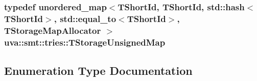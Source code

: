 \subsubsection[{T\+Storage\+Unsigned\+Map}]{\setlength{\rightskip}{0pt plus 5cm}typedef unordered\+\_\+map$<${\bf T\+Short\+Id}, {\bf T\+Short\+Id}, std\+::hash$<${\bf T\+Short\+Id}$>$, std\+::equal\+\_\+to$<${\bf T\+Short\+Id}$>$, {\bf T\+Storage\+Map\+Allocator} $>$ {\bf uva\+::smt\+::tries\+::\+T\+Storage\+Unsigned\+Map}}\label{namespaceuva_1_1smt_1_1tries_a51747124086c47f6b3eb7b66599dbc81}


\subsection{Enumeration Type Documentation}
\hypertarget{namespaceuva_1_1smt_1_1tries_adf9a302134fb7aba4a37f68452546532}{}
